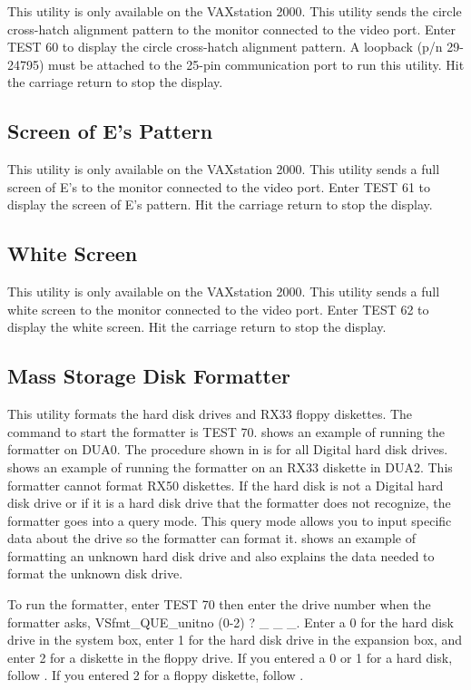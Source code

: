 This utility is only available on the VAXstation 2000. This utility sends the
circle cross-hatch alignment pattern to the monitor connected to the video
port. Enter TEST 60 to display the circle cross-hatch alignment pattern. A
loopback (p/n 29-24795) must be attached to the 25-pin communication port
to run this utility. Hit the carriage return to stop the display.

\subsection{Screen of E's Pattern}

This utility is only available on the VAXstation 2000. This utility sends a full
screen of E's to the monitor connected to the video port. Enter TEST 61 to
display the screen of E's pattern. Hit the carriage return to stop the display.

\subsection{White Screen}

This utility is only available on the VAXstation 2000. This utility sends a full
white screen to the monitor connected to the video port. Enter TEST 62 to
display the white screen. Hit the carriage return to stop the display.

\subsection{Mass Storage Disk Formatter}

This utility formats the hard disk drives and RX33 floppy diskettes. The
command to start the formatter is TEST 70.  shows an example
of running the formatter on DUA0. The procedure shown in  is
for all Digital hard disk drives.  shows an example of running
the formatter on an RX33 diskette in DUA2. This formatter cannot format
RX50 diskettes. If the hard disk is not a Digital hard disk drive or if it is
a hard disk drive that the formatter does not recognize, the formatter goes
into a query mode. This query mode allows you to input specific data about
the drive so the formatter can format it.  shows an example of
formatting an unknown hard disk drive and also explains the data needed
to format the unknown disk drive.


To run the formatter, enter TEST 70 then enter the drive number when the
formatter asks, VSfmt\_QUE\_unitno (0-2) ? \_ \_ \_. Enter a 0 for the hard disk
drive in the system box, enter 1 for the hard disk drive in the expansion
box, and enter 2 for a diskette in the floppy drive. If you entered a 0 or 1
for a hard disk, follow . If you entered 2 for a floppy diskette,
follow .

